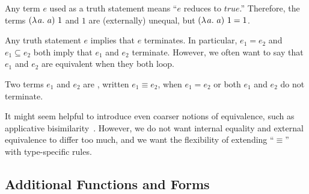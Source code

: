 \documentclass{llncs}
\begin{document}
Any \lzfclang term $\mathit{e}$ used as a truth statement means ``$\mathit{e}$ reduces to $true$.''
Therefore, the terms $(\lambda\mspace{2mu}{a}\ldotp\,{a})~1$ and $1$ are (externally) unequal, but $(\lambda\mspace{2mu}{a}\ldotp\,{a})~1 = 1$.

Any truth statement $\mathit{e}$ implies that $\mathit{e}$ terminates.
In particular, $\mathit{e}_1 = \mathit{e}_2$ and $\mathit{e}_1 \subseteq \mathit{e}_2$ both imply that $\mathit{e}_1$ and $\mathit{e}_2$ terminate.
However, we often want to say that $\mathit{e}_1$ and $\mathit{e}_2$ are equivalent when they both loop.

\begin{definition}
Two \lzfclang terms $\mathit{e_1}$ and $\mathit{e_2}$ are , written $\mathit{e_1} \equiv \mathit{e_2}$, when $\mathit{e_1} = \mathit{e_2}$ or both $\mathit{e_1}$ and $\mathit{e_2}$ do not terminate.
\end{definition}

It might seem helpful to introduce even coarser notions of equivalence, such as applicative bisimilarity~\cite{cit:abramsky-1990rtfp-bisimilarity}.
However, we do not want internal equality and external equivalence to differ too much, and we want the flexibility of extending ``$\equiv$'' with type-specific rules.

\subsection{Additional Functions and Forms}

\newcommand{\smallmathfont}{\fontsize{7.5}{9}\selectfont}
\end{document}
